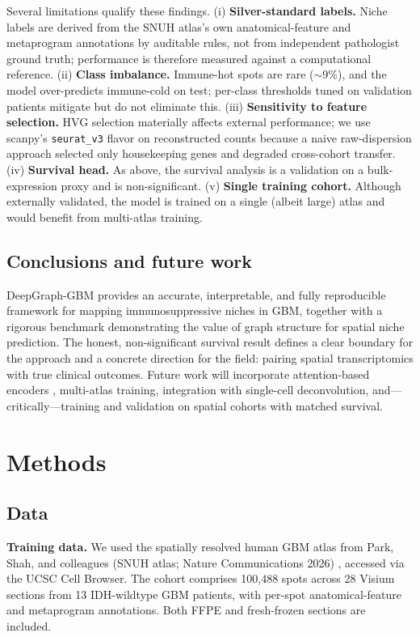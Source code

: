 \documentclass[11pt,letterpaper]{article}
\begin{document}
Several limitations qualify these findings. (i) \textbf{Silver-standard labels.} Niche labels are derived from the SNUH atlas's own anatomical-feature and metaprogram annotations by auditable rules, not from independent pathologist ground truth; performance is therefore measured against a computational reference. (ii) \textbf{Class imbalance.} Immune-hot spots are rare ($\sim$9\%), and the model over-predicts immune-cold on test; per-class thresholds tuned on validation patients mitigate but do not eliminate this. (iii) \textbf{Sensitivity to feature selection.} HVG selection materially affects external performance; we use scanpy's \texttt{seurat\_v3} flavor on reconstructed counts because a naive raw-dispersion approach selected only housekeeping genes and degraded cross-cohort transfer. (iv) \textbf{Survival head.} As above, the survival analysis is a validation on a bulk-expression proxy and is non-significant. (v) \textbf{Single training cohort.} Although externally validated, the model is trained on a single (albeit large) atlas and would benefit from multi-atlas training.

\subsection{Conclusions and future work}

DeepGraph-GBM provides an accurate, interpretable, and fully reproducible framework for mapping immunosuppressive niches in GBM, together with a rigorous benchmark demonstrating the value of graph structure for spatial niche prediction. The honest, non-significant survival result defines a clear boundary for the approach and a concrete direction for the field: pairing spatial transcriptomics with true clinical outcomes. Future work will incorporate attention-based encoders \cite{velickovic2018}, multi-atlas training, integration with single-cell deconvolution, and---critically---training and validation on spatial cohorts with matched survival.

\section{Methods}

\subsection{Data}

\textbf{Training data.} We used the spatially resolved human GBM atlas from Park, Shah, and colleagues (SNUH atlas; Nature Communications 2026) \cite{park2026}, accessed via the UCSC Cell Browser. The cohort comprises 100{,}488 spots across 28 Visium sections from 13 IDH-wildtype GBM patients, with per-spot anatomical-feature and metaprogram annotations. Both FFPE and fresh-frozen sections are included.
\end{document}

